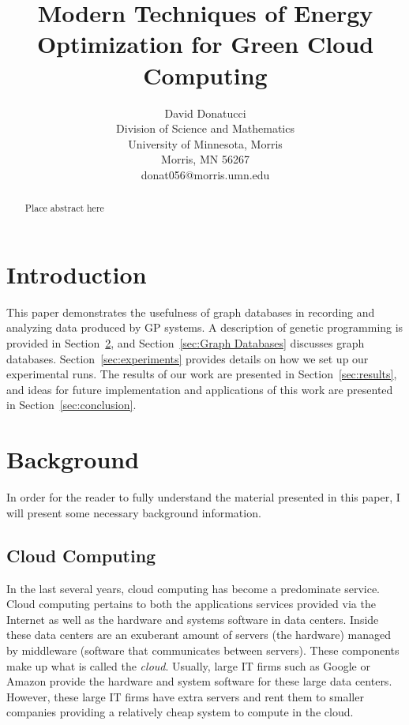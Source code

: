 \documentclass[12pt]{article}
\title{Modern Techniques of Energy Optimization for Green Cloud Computing}
\author{
 		David Donatucci\\
        Division of Science and Mathematics\\
        University of Minnesota, Morris\\
        Morris, MN 56267\\
        donat056@morris.umn.edu\\
}
\date{}
\begin{document}
\pagestyle{plain}

\maketitle

\begin{abstract}

Place abstract here

\end{abstract}

\section{Introduction} \label{sec:intro}

This paper demonstrates the usefulness of graph databases in recording and analyzing data produced by GP systems. A description of genetic programming is provided in Section~\ref{Background}, and Section~\ref{sec:Graph Databases} discusses graph databases. Section~\ref{sec:experiments} provides details on how we set up our experimental runs. The results of our work are presented in Section~\ref{sec:results}, and ideas for future implementation and applications of this work are presented in Section~\ref{sec:conclusion}.

\section{Background} \label{Background}

In order for the reader to fully understand the material presented in this paper, I will present some necessary background information.

\subsection{Cloud Computing}
\label{sec:Cloud Computing}

In the last several years, cloud computing has become a predominate service. Cloud computing pertains to both the applications services provided via the Internet as well as the hardware and systems software in data centers. Inside these data centers are an exuberant amount of servers (the hardware) managed by middleware (software that communicates between servers). These components make up what is called the \emph{cloud}.  Usually, large IT firms such as Google or Amazon provide the hardware and system software for these large data centers. However, these large IT firms have extra servers and rent them to smaller companies providing a relatively cheap system to compute in the cloud. \cite{Armbrust}
\end{document}
